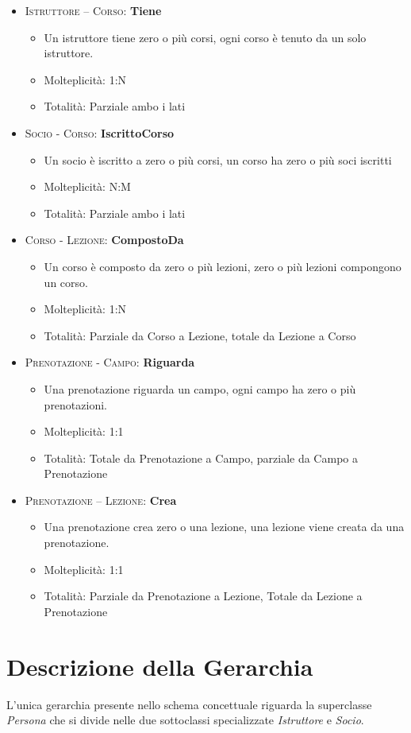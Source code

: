\begin{itemize}
\item \textsc{Istruttore – Corso:} \textbf{Tiene}
\begin{itemize}
\item Un istruttore tiene zero o più corsi, ogni corso è tenuto da un solo istruttore.
\item Molteplicità: 1:N
\item Totalità: Parziale ambo i lati
\end{itemize}
\item \textsc{Socio - Corso:} \textbf{IscrittoCorso}
\begin{itemize}
\item Un socio è iscritto a zero o più corsi, un corso ha zero o più soci iscritti
\item Molteplicità: N:M
\item Totalità: Parziale ambo i lati
\end{itemize}
\item \textsc{Corso - Lezione:} \textbf{CompostoDa}
\begin{itemize}
\item Un corso è composto da zero o più lezioni, zero o più lezioni compongono un corso.
\item Molteplicità: 1:N
\item Totalità: Parziale da Corso a Lezione, totale da Lezione a Corso
\end{itemize}
\item \textsc{Prenotazione - Campo:} \textbf{Riguarda}
\begin{itemize}
\item Una prenotazione riguarda un campo, ogni campo ha zero o più prenotazioni.
\item Molteplicità: 1:1
\item Totalità: Totale da Prenotazione a Campo, parziale da Campo a Prenotazione 
\end{itemize}
\item \textsc{Prenotazione – Lezione:} \textbf{Crea}
\begin{itemize}
\item Una prenotazione crea zero o una lezione, una lezione viene creata da una prenotazione.
\item Molteplicità: 1:1
\item Totalità: Parziale da Prenotazione a Lezione, Totale da Lezione a Prenotazione
\end{itemize}
\end{itemize}

\section{Descrizione della Gerarchia}
L'unica gerarchia presente nello schema concettuale riguarda la superclasse \textit{Persona} che si divide nelle due sottoclassi specializzate \textit{Istruttore} e \textit{Socio}.\\


